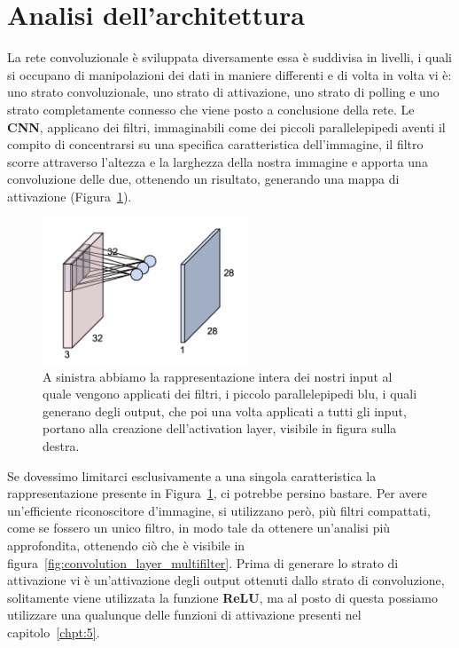\section{Analisi dell'architettura}
La rete convoluzionale è sviluppata diversamente essa è suddivisa in livelli, i quali si occupano di manipolazioni dei dati in maniere differenti e di volta in volta vi è: uno strato convoluzionale, uno strato di attivazione, uno strato di polling e uno strato completamente connesso che viene posto a conclusione della rete. Le \textbf{CNN}, applicano dei filtri, immaginabili come dei piccoli parallelepipedi aventi il compito di concentrarsi su una specifica caratteristica dell'immagine, il filtro scorre attraverso l'altezza e la larghezza della nostra immagine e apporta una convoluzione delle due, ottenendo un risultato, generando una mappa di attivazione (Figura~\ref{fig:convolution_layer}).

\begin{figure}[htbp]
    \centering
    \includegraphics[width=0.55\textwidth]{figure/CNNConv.png}
    \caption{A sinistra abbiamo la rappresentazione intera dei nostri input al quale vengono applicati dei filtri, i piccolo parallelepipedi blu, i quali generano degli output, che poi una volta applicati a tutti gli input, portano alla creazione dell'activation layer, visibile in figura sulla destra.}
    \label{fig:convolution_layer}
\end{figure}

Se dovessimo limitarci esclusivamente a una singola caratteristica la rappresentazione presente in Figura~\ref{fig:convolution_layer}, ci potrebbe persino bastare. Per avere un'efficiente riconoscitore d'immagine, si utilizzano però, più filtri compattati, come se fossero un unico filtro, in modo tale da ottenere un'analisi più approfondita, ottenendo ciò che è visibile in figura~\ref{fig:convolution_layer_multifilter}. Prima di generare lo strato di attivazione vi è un'attivazione degli output ottenuti dallo strato di convoluzione, solitamente viene utilizzata la funzione \textbf{ReLU}, ma al posto di questa possiamo utilizzare una qualunque delle funzioni di attivazione presenti nel capitolo~\ref{chpt:5}.


